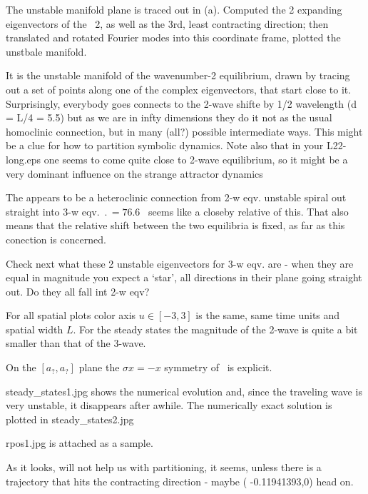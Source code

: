The unstable manifold plane
is traced out in (a).
Computed the 2 expanding eigenvectors of the
\eqv\ {\nameit}2, as well as the 3rd, least contracting direction; then
translated and rotated Fourier modes into this coordinate frame,
plotted the unstbale manifold.


 It is the unstable manifold of the wavenumber-2
equilibrium, drawn by tracing out a set of points along one of the complex
eigenvectors, that start close to it. Surprisingly, everybody goes connects
to the 2-wave shifte by 1/2 wavelength (d = L/4 = 5.5) but as we are in
infty dimensions they do it not as the usual homoclinic connection, but in
many (all?) possible intermediate ways. This might be a clue for how to
partition symbolic dynamics. Note also that in your L22-long.eps one seems
to come quite close to 2-wave equilibrium, so it might be a very dominant
influence on the strange attractor dynamics


The appears to be a heteroclinic connection from 2-w eqv.
unstable spiral out straight into 3-w eqv. 
$\period{} = 76.6$ \rpo\ seems like a closeby
relative of this.
That also means that the relative shift between the two equilibria is
fixed, as far as this conection is concerned.

Check next what these 2 unstable eigenvectors for 3-w eqv. are - when they
are equal in magnitude you expect a `star', all directions in their plane
going straight out. Do they all fall int 2-w eqv?

% 

For all spatial plots color axis $u \in [-3, 3]$ is the same,
same time units and spatial width $L$.
For the steady states the magnitude of the 2-wave is quite 
a bit smaller than that of the 3-wave.

On the 
	$[a_?,a_?]$ plane
	the $\sigma x = -x$ symmetry of \KSe\ is explicit.


steady\_states1.jpg shows the numerical evolution and, since the
traveling wave is very unstable, it disappears after awhile. 
The numerically exact solution is plotted in steady\_states2.jpg

rpos1.jpg is attached as a sample. 

As it looks, will not help us with partitioning, it seems, unless there is
a trajectory that hits the contracting direction - maybe
( -0.11941393,0)
head on.

